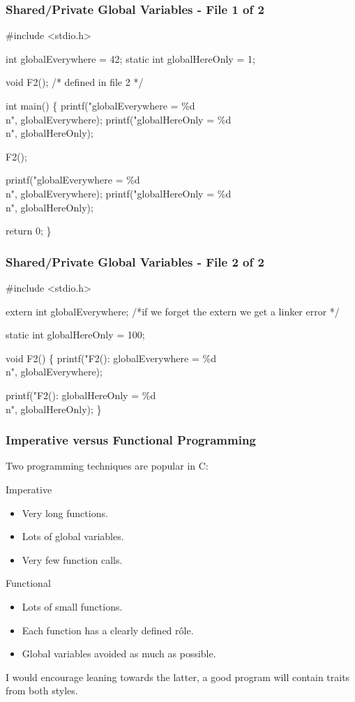 \documentclass[table]{beamer}
\newif\ifschigh\schighfalse
\newcommand{\kw}[1]{\ifschigh\textcolor{red}{#1}\else\textcolor{keyword}{#1}\fi}
\newcommand{\kt}[1]{\ifschigh\textcolor{red}{#1}\else\textcolor{ctext}{#1}\fi}
\newcommand{\kc}[1]{\ifschigh\textcolor{red}{#1}\else\textcolor{comment}{#1}\fi}
\newcounter{sckll}
\newcommand{\kr}{\setcounter{sckll}{1}}
\newcommand{\kl}{}
\begin{document}
\begin{frame}[fragile]
\frametitle{Shared/Private Global Variables - File 1 of 2}
\begin{semiverbatim}
\footnotesize
\kr\kl\kw{\#include} \kt{<stdio.h>}
\kl
\kl\kw{int} globalEverywhere = 42;
\kl\kw{static int} globalHereOnly = 1;
\kl
\kl\kw{void} F2(); \kc{/* defined in file 2 */}
\kl
\kl\kw{int} main()
\kl\{
\kl   printf(\kt{"globalEverywhere = \%d\\n"}, globalEverywhere);
\kl   printf(\kt{"globalHereOnly = \%d\\n"}, globalHereOnly);
\kl
\kl   F2();
\kl
\kl   printf(\kt{"globalEverywhere = \%d\\n"}, globalEverywhere);
\kl   printf(\kt{"globalHereOnly = \%d\\n"}, globalHereOnly);
\kl
\kl   \kw{return} 0;
\kl\}
\end{semiverbatim}
\end{frame}

\begin{frame}[fragile]
\frametitle{Shared/Private Global Variables - File 2 of 2}
\vspace{-0.1in}
\begin{semiverbatim}
\small
\kr\kl\kw{\#include} \kt{<stdio.h>}
\kl
\kl\kw{extern int} globalEverywhere;
\kl\kc{/*if we forget the extern we get a linker error */}
\kl
\kl\kw{static int} globalHereOnly = 100;
\kl
\kl\kw{void} F2()
\kl\{
\kl   printf(\kt{"F2(): globalEverywhere = \%d\\n"},
\kl                 globalEverywhere);
\kl                 
\kl   printf(\kt{"F2(): globalHereOnly = \%d\\n"},
\kl                 globalHereOnly);
\kl\}
\end{semiverbatim}
\end{frame}

\begin{frame}
\frametitle{Imperative versus Functional Programming}
Two programming techniques are popular in C:
\begin{alertblock}{Imperative}
\begin{itemize}
\item Very long functions.
\item Lots of global variables.
\item Very few function calls.
\end{itemize}
\end{alertblock}

\begin{exampleblock}{Functional}
\begin{itemize}
\item Lots of small functions.
\item Each function has a clearly defined r\^ole.
\item Global variables avoided as much as possible.
\end{itemize}
\end{exampleblock}

I would encourage leaning towards the latter, a good program will contain traits from both styles.
\end{frame}
\end{document}
